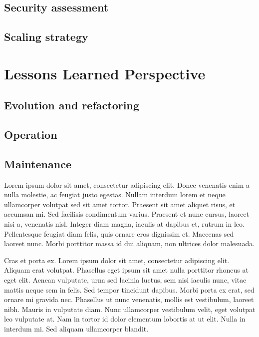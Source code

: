 \documentclass[12pt, a4paper]{book}
\begin{document}
\section{Security assessment}

\section{Scaling strategy}

\chapter{Lessons Learned Perspective}

\section{Evolution and refactoring}

\section{Operation}

\section{Maintenance}


Lorem ipsum dolor sit amet, consectetur adipiscing elit. Donec venenatis enim a nulla molestie, ac feugiat justo egestas. Nullam interdum lorem et neque ullamcorper volutpat sed sit amet tortor. Praesent sit amet aliquet risus, et accumsan mi. Sed facilisis condimentum varius. Praesent et nunc cursus, laoreet nisi a, venenatis nisl. Integer diam magna, iaculis at dapibus et, rutrum in leo. Pellentesque feugiat diam felis, quis ornare eros dignissim et. Maecenas sed laoreet nunc. Morbi porttitor massa id dui aliquam, non ultrices dolor malesuada.

Cras et porta ex. Lorem ipsum dolor sit amet, consectetur adipiscing elit. Aliquam erat volutpat. Phasellus eget ipsum sit amet nulla porttitor rhoncus at eget elit. Aenean vulputate, urna sed lacinia luctus, sem nisi iaculis nunc, vitae mattis neque sem in felis. Sed tempor tincidunt dapibus. Morbi porta ex erat, sed ornare mi gravida nec. Phasellus ut nunc venenatis, mollis est vestibulum, laoreet nibh. Mauris in vulputate diam. Nunc ullamcorper vestibulum velit, eget volutpat leo vulputate at. Nam in tortor id dolor elementum lobortis at ut elit. Nulla in interdum mi. Sed aliquam ullamcorper blandit.



\end{document}
